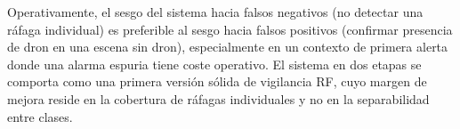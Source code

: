 Operativamente, el sesgo del sistema hacia falsos negativos (no detectar una ráfaga individual) es preferible al sesgo hacia falsos positivos (confirmar presencia de dron en una escena sin dron), especialmente en un contexto de primera alerta donde una alarma espuria tiene coste operativo. El sistema en dos etapas se comporta como una primera versión sólida de vigilancia RF, cuyo margen de mejora reside en la cobertura de ráfagas individuales y no en la separabilidad entre clases.
